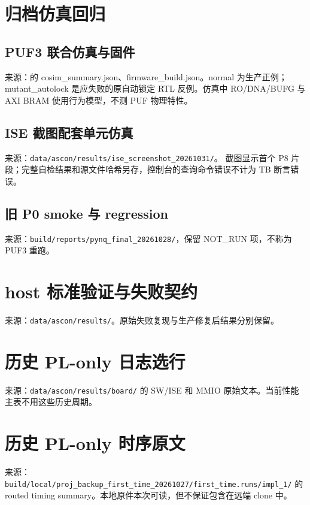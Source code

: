 \Needspace{85pt}
\section{归档仿真回归}
\subsection{PUF3 联合仿真与固件}
来源：\pufreports 的 cosim\_summary.json、firmware\_build.json。normal 为生产正例；mutant\_autolock 是应失败的原自动锁定 RTL 反例。仿真中 RO/DNA/BUFG 与 AXI BRAM 使用行为模型，不测 PUF 物理特性。

\subsection{ISE 截图配套单元仿真}
来源：\texttt{data/ascon/results/\allowbreak{}ise\_screenshot\_20261031/}。
截图显示首个 P8 片段；完整自检结果和源文件哈希另存，控制台的查询命令错误不计为 TB 断言错误。

\subsection{旧 P0 smoke 与 regression}
来源：\texttt{build/reports/pynq\_final\_20261028/}，保留 NOT\_RUN 项，不称为 PUF3 重跑。


\Needspace{85pt}
\section{host 标准验证与失败契约}
来源：\texttt{data/ascon/results/}。原始失败复现与生产修复后结果分别保留。


\Needspace{85pt}
\section{历史 PL-only 日志选行}
来源：\texttt{data/ascon/results/board/} 的 SW/ISE 和 MMIO 原始文本。当前性能主表不用这些历史周期。


\Needspace{85pt}
\section{历史 PL-only 时序原文}
来源：\texttt{build/local/\allowbreak{}proj\_backup\_first\_time\_20261027/\allowbreak{}first\_time.runs/\allowbreak{}impl\_1/} 的 routed timing summary。本地原件本次可读，但不保证包含在远端 clone 中。


